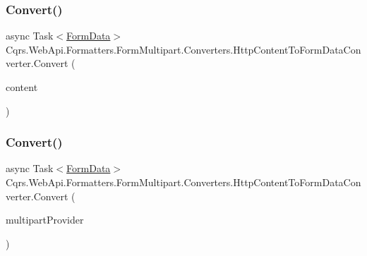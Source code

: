 \subsubsection{\texorpdfstring{Convert()}{Convert()}\hspace{0.1cm}{\footnotesize\ttfamily [1/2]}}
{\footnotesize\ttfamily async Task$<$\hyperlink{classCqrs_1_1WebApi_1_1Formatters_1_1FormMultipart_1_1Infrastructure_1_1FormData}{Form\+Data}$>$ Cqrs.\+Web\+Api.\+Formatters.\+Form\+Multipart.\+Converters.\+Http\+Content\+To\+Form\+Data\+Converter.\+Convert (\begin{DoxyParamCaption}\item[{Http\+Content}]{content }\end{DoxyParamCaption})}

\mbox{\label{classCqrs_1_1WebApi_1_1Formatters_1_1FormMultipart_1_1Converters_1_1HttpContentToFormDataConverter_ae6f522873d47a96df7b4616c7e2d6290}} 
\subsubsection{\texorpdfstring{Convert()}{Convert()}\hspace{0.1cm}{\footnotesize\ttfamily [2/2]}}
{\footnotesize\ttfamily async Task$<$\hyperlink{classCqrs_1_1WebApi_1_1Formatters_1_1FormMultipart_1_1Infrastructure_1_1FormData}{Form\+Data}$>$ Cqrs.\+Web\+Api.\+Formatters.\+Form\+Multipart.\+Converters.\+Http\+Content\+To\+Form\+Data\+Converter.\+Convert (\begin{DoxyParamCaption}\item[{Multipart\+Memory\+Stream\+Provider}]{multipart\+Provider }\end{DoxyParamCaption})}

